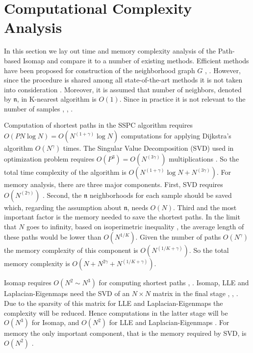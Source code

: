 \documentclass[10pt,journal,cspaper,compsoc]{IEEEtran}
\begin{document}
\section{Computational Complexity Analysis}
In this section we lay out time and memory complexity analysis of the Path-based Isomap and compare it to a number of existing methods. Efficient methods have been proposed for construction of the neighborhood graph $G$ \cite{indyk2004nearest}, \cite{seidl1998optimal}. However, since the procedure is shared among all state-of-the-art methods it is not taken into consideration \cite{van2009dimensionality}. Moreover, it is assumed that number of neighbors, denoted by $\mathfrak{n}$, in K-nearest algorithm is $O(1)$. Since in practice it is not relevant to the number of samples \cite{tenenbaum2000global}, \cite{roweis2000nonlinear}, \cite{belkin2003laplacian}. 

Computation of shortest paths in the SSPC algorithm requires $O(PN\log{N})=O\left(N^{(1+\gamma)}\log{N}\right)$ computations for applying Dijkstra's algorithm \cite{even2011graph} $O(N^{\gamma})$ times. The Singular Value Decomposition (SVD) used in optimization problem requires $O\left(P^3\right)=O\left(N^{(3\gamma)}\right)$ multiplications \cite{henry2010singular}. So the total time complexity of the algorithm is $O\left(N^{\left(1+\gamma\right)}\log{N}+N^{(3\gamma)}\right)$. For memory analysis, there are three major components. First, SVD requires $O\left(N^{\left(2\gamma\right)}\right)$ \cite{henry2010singular}. Second, the $\mathfrak{n}$ neighborhoods for each sample should be saved which, regarding the assumption about $\mathfrak{n}$, needs $O\left(N\right)$. Third and the most important factor is the memory needed to save the shortest paths. In the limit that $N$ goes to infinity, based on isoperimetric inequality \cite{osserman1978isoperimetric}, the average length of these paths would be lower than $O\left(N^{1/K}\right)$. Given the number of paths $O\left(N^{\gamma}\right)$ the memory complexity of this component is $O\left(N^{\left(1/K+\gamma\right)}\right)$. So the total memory complexity is $O\left(N+N^{2\gamma}+N^{\left(1/K+\gamma\right)}\right)$. 

Isomap requires $O\left(N^2\sim N^3\right)$ for computing shortest paths \cite{balasubramanian2002isomap}, \cite{pallottino1984shortest}. Isomap, LLE and Laplacian-Eigenmaps need the SVD of an $N\times N$ matrix in the final stage \cite{tenenbaum2000global}, \cite{roweis2000nonlinear}, \cite{belkin2003laplacian}. Due to the sparsity of this matrix for LLE and Laplacian-Eigenmaps the complexity will be reduced. Hence computations in the latter stage will be $O\left(N^3\right)$ for Isomap, and $O\left(N^2\right)$ for LLE and Laplacian-Eigenmaps \cite{berry1992large}. For memory the only important component, that is the memory required by SVD, is $O\left(N^2\right)$ \cite{berry1992large}.
\end{document}

